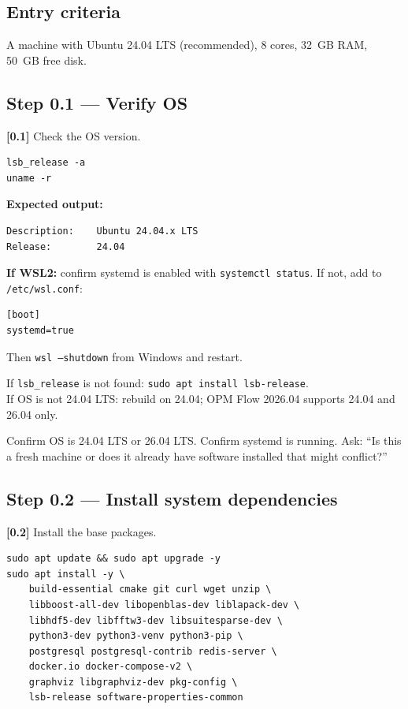 \documentclass[10pt,a4paper]{article}
\newcommand{\stepID}[1]{\textsf{\textbf{[#1]}}}
\newcommand{\cmd}[1]{\texttt{#1}}
\newcommand{\file}[1]{\texttt{#1}}
\begin{document}
\subsection{Entry criteria}
A machine with Ubuntu 24.04 LTS (recommended), 8 cores, 32~GB RAM, 50~GB free disk.

\subsection{Step 0.1 --- Verify OS}

\stepID{0.1} Check the OS version.

\begin{lstlisting}[style=sh]
lsb_release -a
uname -r
\end{lstlisting}

\textbf{Expected output:}
\begin{lstlisting}[style=txt]
Description:    Ubuntu 24.04.x LTS
Release:        24.04
\end{lstlisting}

\textbf{If WSL2:} confirm systemd is enabled with \cmd{systemctl status}. If not, add to \file{/etc/wsl.conf}:
\begin{lstlisting}[style=txt]
[boot]
systemd=true
\end{lstlisting}
Then \cmd{wsl --shutdown} from Windows and restart.

\begin{failure}
If \cmd{lsb\_release} is not found: \cmd{sudo apt install lsb-release}.\\
If OS is not 24.04 LTS: rebuild on 24.04; OPM Flow 2026.04 supports 24.04 and 26.04 only.
\end{failure}

\begin{aicheckpoint}
Confirm OS is 24.04 LTS or 26.04 LTS. Confirm systemd is running. Ask: ``Is this a fresh machine or does it already have software installed that might conflict?''
\end{aicheckpoint}

\subsection{Step 0.2 --- Install system dependencies}

\stepID{0.2} Install the base packages.

\begin{lstlisting}[style=sh]
sudo apt update && sudo apt upgrade -y
sudo apt install -y \
    build-essential cmake git curl wget unzip \
    libboost-all-dev libopenblas-dev liblapack-dev \
    libhdf5-dev libfftw3-dev libsuitesparse-dev \
    python3-dev python3-venv python3-pip \
    postgresql postgresql-contrib redis-server \
    docker.io docker-compose-v2 \
    graphviz libgraphviz-dev pkg-config \
    lsb-release software-properties-common
\end{lstlisting}
\end{document}
